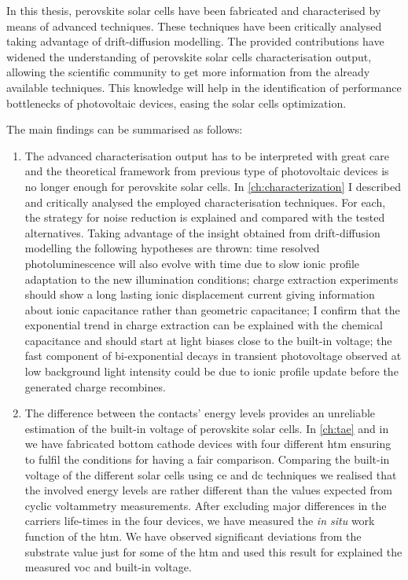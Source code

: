 
In this thesis, perovskite solar cells have been fabricated and characterised by means of advanced techniques.
These techniques have been critically analysed taking advantage of drift\hyp{}diffusion modelling.
The provided contributions have widened the understanding of perovskite solar cells characterisation output, allowing the scientific community to get more information from the already available techniques.
This knowledge will help in the identification of performance bottlenecks of photovoltaic devices, easing the solar cells optimization.

The main findings can be summarised as follows:
\begin{enumerate}
	\item The advanced characterisation output has to be interpreted with great care and the theoretical framework from previous type of photovoltaic devices is no longer enough for perovskite solar cells.
	In \cref{ch:characterization} I described and critically analysed the employed characterisation techniques.
	For each, the strategy for noise reduction is explained and compared with the tested alternatives.
	Taking advantage of the insight obtained from drift\hyp{}diffusion modelling the following hypotheses are thrown:
	time resolved photoluminescence will also evolve with time due to slow ionic profile adaptation to the new illumination conditions;
	charge extraction experiments should show a long lasting ionic displacement current giving information about ionic capacitance rather than geometric capacitance;
	I confirm that the exponential trend in charge extraction can be explained with the chemical capacitance and should start at light biases close to the built-in voltage;
	the fast component of bi\hyp{}exponential decays in transient photovoltage observed at low background light intensity could be due to ionic profile update before the generated charge recombines.
	
	\item The difference between the contacts' energy levels provides an unreliable estimation of the built-in voltage of perovskite solar cells.
	In \cref{ch:tae} and in \cite{Gelmetti2019} we have fabricated bottom cathode devices with four different \gls{htm} ensuring to fulfil the conditions for having a fair comparison.
	Comparing the built-in voltage of the different solar cells using \gls{ce} and \gls{dc} techniques we realised that the involved energy levels are rather different than the values expected from cyclic voltammetry measurements.
	After excluding major differences in the carriers life-times in the four devices, we have measured the \textsl{in situ} work function of the \gls{htm}.
	We have observed significant deviations from the substrate value just for some of the \gls{htm} and used this result for explained the measured \gls{voc} and built-in voltage.
		

\end{enumerate}
